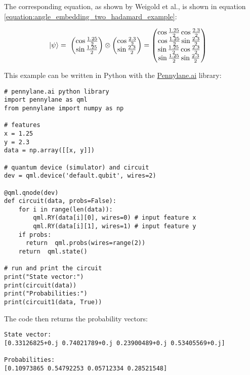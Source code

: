 The corresponding equation, as shown by Weigold et al.\cite{Weigold2021_ExpandingDataEncodingPatterns}, is shown in equation \ref{equation:angle_embedding_two_hadamard_example}:

\begin{equation}
    \centering
    \begin{split}
        \ket{\psi} &=\ \begin{pmatrix}\cos{\frac{1.25}{2}} \\ \sin{\frac{1.25}{2}}\end{pmatrix} \otimes \begin{pmatrix}\cos{\frac{2.3}{2}} \\ \sin{\frac{2.3}{2}}\end{pmatrix} = \begin{pmatrix}
            \cos{\frac{1.25}{2}}\cos{\frac{2.3}{2}}\\
            \cos{\frac{1.25}{2}}\sin{\frac{2.3}{2}}\\
            \sin{\frac{1.25}{2}}\cos{\frac{2.3}{2}}\\
            \sin{\frac{1.25}{2}}\sin{\frac{2.3}{2}}
        \end{pmatrix}
    \end{split}
    \label{equation:angle_embedding_two_hadamard_example}
\end{equation}

\newpage
This example can be written in Python with the \href{https://www.pennylane.ai}{Pennylane.ai} library:

\begin{verbatim}
# pennylane.ai python library
import pennylane as qml
from pennylane import numpy as np

# features
x = 1.25
y = 2.3
data = np.array([[x, y]])

# quantum device (simulator) and circuit
dev = qml.device('default.qubit', wires=2)

@qml.qnode(dev)
def circuit(data, probs=False):
    for i in range(len(data)):
        qml.RY(data[i][0], wires=0) # input feature x
        qml.RY(data[i][1], wires=1) # input feature y
    if probs:
      return  qml.probs(wires=range(2))
    return  qml.state()

# run and print the circuit
print("State vector:")
print(circuit(data))
print("Probabilities:")
print(circuit1(data, True))
\end{verbatim}

\noindent The code then returns the probability vectors:
\begin{verbatim}
State vector:
[0.33126825+0.j 0.74021789+0.j 0.23900489+0.j 0.53405569+0.j]

Probabilities:
[0.10973865 0.54792253 0.05712334 0.28521548]
\end{verbatim}


